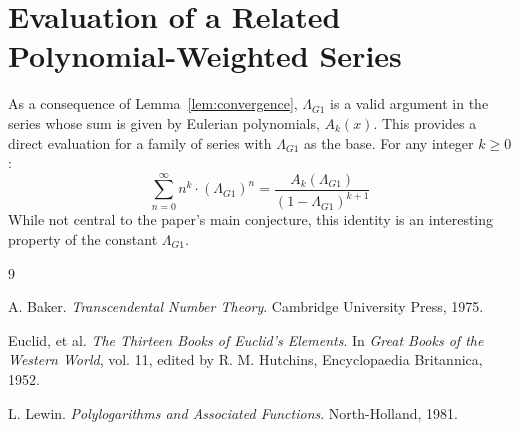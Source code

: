 \documentclass{amsart}
\theoremstyle{plain}
\theoremstyle{definition}
\theoremstyle{remark}
\newcommand{\LambdaG}{\Lambda_{G1}}
\begin{document}
\section{Evaluation of a Related Polynomial-Weighted Series}
As a consequence of Lemma~\ref{lem:convergence}, $\LambdaG$ is a valid argument in the series whose sum is given by Eulerian polynomials, $A_k(x)$. This provides a direct evaluation for a family of series with $\LambdaG$ as the base. For any integer $k \ge 0$:
$$ \sum_{n=0}^{\infty} n^k \cdot (\LambdaG)^n = \frac{A_k(\LambdaG)}{(1-\LambdaG)^{k+1}} $$
While not central to the paper's main conjecture, this identity is an interesting property of the constant $\LambdaG$.

\begin{thebibliography}{9}

A. Baker. \textit{Transcendental Number Theory}. Cambridge University Press, 1975.

Euclid, et al. \textit{The Thirteen Books of Euclid's Elements}. In \textit{Great Books of the Western World}, vol. 11, edited by R. M. Hutchins, Encyclopaedia Britannica, 1952. 

L. Lewin. \textit{Polylogarithms and Associated Functions}. North-Holland, 1981.

\end{thebibliography}
\end{document}
